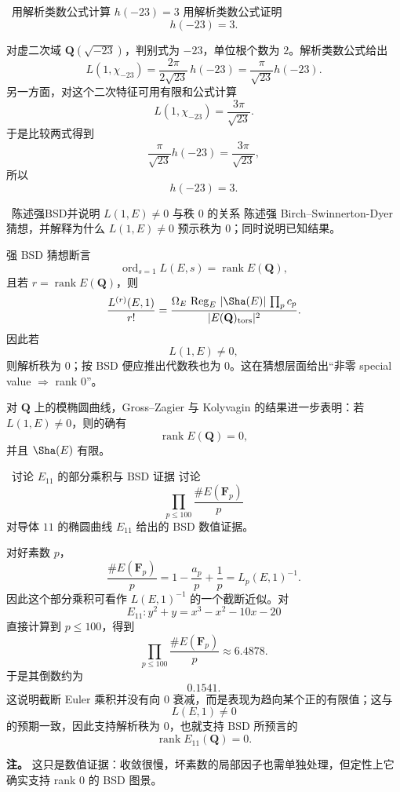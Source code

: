 \begin{problem}{\hard\ 用解析类数公式计算 $h(-23)=3$}
用解析类数公式证明
\[
h(-23)=3.
\]
\end{problem}
\begin{solution}
对虚二次域 $\mathbf Q(\sqrt{-23})$，判别式为 $-23$，单位根个数为 $2$。解析类数公式给出
\[
L(1,\chi_{-23})=\frac{2\pi}{2\sqrt{23}}\,h(-23)=\frac{\pi}{\sqrt{23}}h(-23).
\]
另一方面，对这个二次特征可用有限和公式计算
\[
L(1,\chi_{-23})=\frac{3\pi}{\sqrt{23}}.
\]
于是比较两式得到
\[
\frac{\pi}{\sqrt{23}}h(-23)=\frac{3\pi}{\sqrt{23}},
\]
所以
\[
h(-23)=3.
\]
\end{solution}

\begin{problem}{\hard\ 陈述强BSD并说明 $L(1,E)\neq0$ 与秩 $0$ 的关系}
陈述强 Birch--Swinnerton-Dyer 猜想，并解释为什么 $L(1,E)\neq0$ 预示秩为 $0$；同时说明已知结果。
\end{problem}
\begin{solution}
强 BSD 猜想断言
\[
\operatorname{ord}_{s=1}L(E,s)=\operatorname{rank}E(\mathbf Q),
\]
且若 $r=\operatorname{rank}E(\mathbf Q)$，则
\[
\frac{L^{(r)}(E,1)}{r!}
=
\frac{\Omega_E\,\operatorname{Reg}_E\,|\Sha(E)|\,\prod_pc_p}
{|E(\mathbf Q)_{\mathrm{tors}}|^2}.
\]
因此若
\[
L(1,E)\neq0,
\]
则解析秩为 $0$；按 BSD 便应推出代数秩也为 $0$。这在猜想层面给出“非零 special value $\Rightarrow$ rank $0$”。

对 $\mathbf Q$ 上的模椭圆曲线，Gross--Zagier 与 Kolyvagin 的结果进一步表明：若 $L(1,E)\neq0$，则的确有
\[
\operatorname{rank}E(\mathbf Q)=0,
\]
并且 $\Sha(E)$ 有限。
\end{solution}

\begin{problem}{\hard\ 讨论 $E_{11}$ 的部分乘积与 BSD 证据}
讨论
\[
\prod_{p\le100}\frac{\#E(\mathbf F_p)}{p}
\]
对导体 $11$ 的椭圆曲线 $E_{11}$ 给出的 BSD 数值证据。
\end{problem}
\begin{solution}
对好素数 $p$，
\[
\frac{\#E(\mathbf F_p)}{p}
=
1-\frac{a_p}{p}+\frac1p
=
L_p(E,1)^{-1}.
\]
因此这个部分乘积可看作 $L(E,1)^{-1}$ 的一个截断近似。对
\[
E_{11}: y^2+y=x^3-x^2-10x-20
\]
直接计算到 $p\le100$，得到
\[
\prod_{p\le100}\frac{\#E(\mathbf F_p)}{p}\approx 6.4878.
\]
于是其倒数约为
\[
0.1541.
\]
这说明截断 Euler 乘积并没有向 $0$ 衰减，而是表现为趋向某个正的有限值；这与
\[
L(E,1)\neq0
\]
的预期一致，因此支持解析秩为 $0$，也就支持 BSD 所预言的
\[
\operatorname{rank}E_{11}(\mathbf Q)=0.
\]

\textbf{注。} 这只是数值证据：收敛很慢，坏素数的局部因子也需单独处理，但定性上它确实支持 rank $0$ 的 BSD 图景。
\end{solution}
